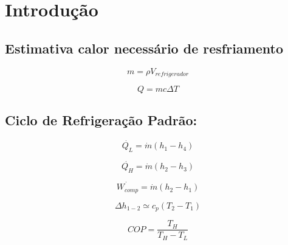 \chapter{Introdução}

\section{Estimativa calor necessário de resfriamento}

\begin{equation}
    m = \rho V_{refrigerador}
    \label{massa peixe}
\end{equation}

\begin{equation}
    Q = m c \Delta T
    \label{Q resfriamento}
\end{equation}

\section{Ciclo de Refrigeração Padrão:}

\begin{equation}
    \dot{Q_L} = \dot{m}(h_1-h_4)
    \label{QL}
\end{equation}

\begin{equation}
    \dot{Q_H} = \dot{m}(h_2-h_3)
    \label{QH}
\end{equation}

\begin{equation}
    \dot{W_{comp}} = \dot{m}(h_2-h_1)
    \label{W compressor}
\end{equation}

\begin{equation}
    \Delta h_{1-2} \simeq  c_p (T_2-T_1)
    \label{simplificacao entalpia}
\end{equation}

\begin{equation}
    COP = \frac{T_H}{T_H - T_L}
    \label{COP carnot}
\end{equation}




